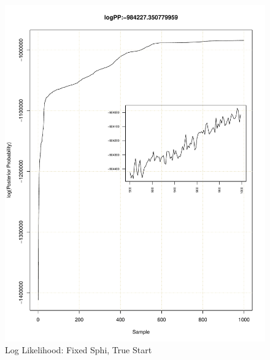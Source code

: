 \documentclass[11pt]{labbook}
\begin{document}
    \begin{figure}
        \centering
        \includegraphics[scale=.65]{FONSE_Plots/2016/November_8/fixedSphi_sim_like}
        \caption{Log Likelihood: Fixed Sphi, True Start}
        \label{fig:NOV8_F.S.LIK}
    \end{figure}
\end{document}
